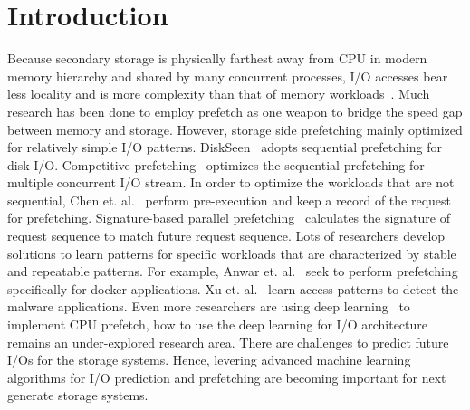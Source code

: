 
\section{Introduction}

Because secondary storage is physically farthest away from CPU in modern memory hierarchy
and shared by many concurrent processes,
I/O accesses bear less locality and is more complexity than that of memory workloads~\cite{yang1992novel}.
Much research has been done to employ prefetch as one weapon to bridge the speed gap between memory and storage.
However, storage side prefetching mainly optimized for relatively simple I/O patterns.
DiskSeen~\cite{ding2007diskseen} adopts sequential prefetching for disk I/O.
Competitive prefetching~\cite{li2007competitive} optimizes the sequential prefetching for multiple concurrent I/O stream.
In order to optimize the workloads that are not sequential,
Chen et. al.~\cite{chen2008hiding} perform pre-execution and keep a record of the request for prefetching.
Signature-based parallel prefetching~\cite{byna2008parallel} calculates the signature of request sequence to match future request sequence. %
Lots of researchers develop solutions to learn patterns for
specific workloads that are characterized by stable and repeatable patterns.
For example, Anwar et. al.~\cite{anwar2018improving} seek to perform
prefetching specifically for docker applications. %
Xu et. al.~\cite{xu2017malware} learn access patterns to detect
the malware applications.
Even more researchers are using deep learning~\cite{hashemi2018learning} to implement CPU prefetch,
how to use the deep learning for I/O architecture remains an under-explored research area.
There are challenges to predict future I/Os for the storage systems.
Hence, levering advanced machine learning algorithms for I/O prediction and prefetching
are becoming important for next generate storage systems.

